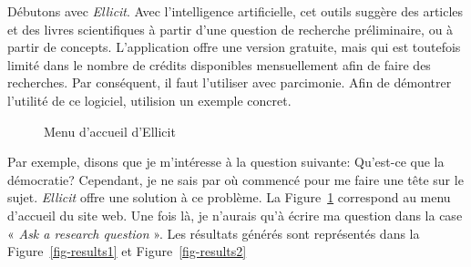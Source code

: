 \documentclass[
  letterpaper,
  DIV=11,
  numbers=noendperiod]{scrreprt}
\begin{document}
Débutons avec \emph{Ellicit}. Avec l'intelligence artificielle, cet
outils suggère des articles et des livres scientifiques à partir d'une
question de recherche préliminaire, ou à partir de concepts.
L'application offre une version gratuite, mais qui est toutefois limité
dans le nombre de crédits disponibles mensuellement afin de faire des
recherches. Par conséquent, il faut l'utiliser avec parcimonie. Afin de
démontrer l'utilité de ce logiciel, utilision un exemple concret.

\begin{figure}


\caption{\label{fig-ellicit}Menu d'accueil d'Ellicit}

\end{figure}%

Par exemple, disons que je m'intéresse à la question suivante: Qu'est-ce
que la démocratie? Cependant, je ne sais par où commencé pour me faire
une tête sur le sujet. \emph{Ellicit} offre une solution à ce problème.
La Figure~\ref{fig-ellicit} correspond au menu d'accueil du site web.
Une fois là, je n'aurais qu'à écrire ma question dans la case «
\emph{Ask a research question} ». Les résultats générés sont représentés
dans la Figure~\ref{fig-results1} et Figure~\ref{fig-results2}
\end{document}
